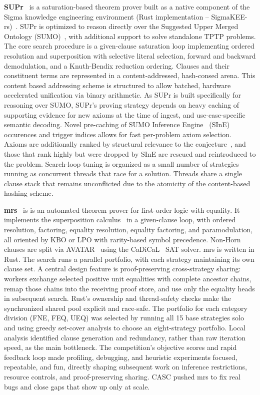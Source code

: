 \documentclass[aic]{iosart2x}
\begin{document}
\textbf{SUPr}~\cite{KP26} is a saturation-based theorem prover built as a native component of the 
Sigma knowledge engineering environment (Rust implementation -- SigmaKEE-rs)~\cite{PS14}.
SUPr is optimized to reason directly over the Suggested Upper Merged Ontology (SUMO)~\cite{Pea11}, 
with additional support to solve standalone TPTP problems. 
The core search procedure is a given-clause saturation loop implementing ordered resolution and 
superposition with selective literal selection, forward and backward demodulation, and a 
Knuth-Bendix reduction ordering. 
Clauses and their constituent terms are represented in a content-addressed, hash-consed arena. 
This content based addressing scheme is structured to allow batched, hardware accelerated 
unification via binary arithmetic.
As SUPr is built specifically for reasoning over SUMO, SUPr's proving strategy depends on heavy 
caching of supporting evidence for new axioms at the time of ingest, and use-case-specific 
semantic decoding.
Novel pre-caching of SUMO Inference Engine~\cite{HV11} (SInE) occurences and trigger indices allows 
for fast per-problem axiom selection. 
Axioms are additionally ranked by structural relevance to the conjecture~\cite{LX22}, and those 
that rank highly but were dropped by SInE are rescued and reintroduced to the problem.
Search-loop tuning is organized as a small number of strategies running as concurrent threads 
that race for a solution. 
Threads share a single clause stack that remains unconflicted due to the atomicity of the 
content-based hashing scheme.
 
\textbf{mrs}~\cite{Rol26} is is an automated theorem prover for first-order logic with equality. 
It implements the superposition calculus~\cite{BG94} in a given-clause loop, with ordered 
resolution, factoring, equality resolution, equality factoring, and paramodulation, all oriented 
by KBO or LPO with rarity-based symbol precedence. 
Non-Horn clauses are split via AVATAR~\cite{Vor14} using the CaDiCaL~\cite{BF+24} SAT solver.
mrs is written in Rust.
The search runs a parallel portfolio, with each strategy maintaining its own clause set. 
A central design feature is proof-preserving cross-strategy sharing: workers exchange selected 
positive unit equalities with complete ancestor chains, remap those chains into the receiving proof 
store, and use only the equality heads in subsequent search.
Rust's ownership and thread-safety checks make the synchronized shared pool explicit and race-safe.
The portfolio for each category division (FNE, FEQ, UEQ) was selected by running all 15 base 
strategies solo and using greedy set-cover analysis to choose an eight-strategy portfolio. 
Local analysis identified clause generation and redundancy, rather than raw iteration speed, as 
the main bottleneck. 
The competition's objective scores and rapid feedback loop made profiling, debugging, and heuristic 
experiments focused, repeatable, and fun, directly shaping subsequent work on inference 
restrictions, resource controls, and proof-preserving sharing. 
CASC pushed mrs to fix real bugs and close gaps that show up only at scale.
\end{document}
